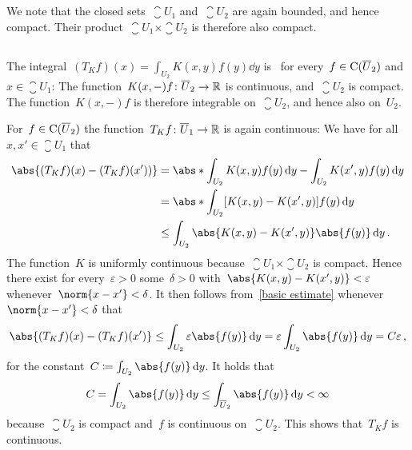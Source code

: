 \section{}

We note that the closed sets~$\closure{U}_1$ and~$\closure{U}_2$ are again bounded, and hence compact.
Their product~$\closure{U}_1 \times \closure{U}_2$ is therefore also compact.





\subsection{}

The integral~$(T_K f)(x) = \int_{U_2} K(x,y) f(y) \dd{y}$ is~{\welldef} for every~$f \in \operatorname{C}(\overline{U}_2)$ and~$x \in \closure{U}_1$:
The function~$K(x,-)f \colon \overline{U}_2 \to \mathbb{R}$ is continuous, and~$\closure{U}_2$ is compact.
The function~$K(x,-)f$ is therefore integrable on~$\closure{U}_2$, and hence also on~$U_2$.

For~$f \in \operatorname{C}(\overline{U}_2)$ the function~$T_K f \colon \overline{U}_1 \to \mathbb{R}$ is again continuous:
We have for all~$x, x' \in \closure{U}_1$ that
\begin{equation}
  \label{basic estimate}
  \begin{aligned}
          \abs{ (T_K f)(x) - (T_K f)(x') ) }
    &=    \abs*{ \int_{U_2} K(x,y) f(y) \dd{y} - \int_{U_2} K(x',y) f(y) \dd{y} } \\
    &=    \abs*{ \int_{U_2} [K(x,y) - K(x',y)] f(y) \dd{y} }  \\
    &\leq \int_{U_2} \abs{K(x,y) - K(x',y)} \abs{f(y)} \dd{y} \,.
  \end{aligned}
\end{equation}
The function~$K$ is uniformly continuous because~$\closure{U}_1 \times \closure{U}_2$ is compact.
Hence there exist for every~$\varepsilon > 0$ some~$\delta > 0$ with~$\abs{K(x,y) - K(x',y)} < \varepsilon$ whenever~$\norm{x - x'} < \delta$.
It then follows from~\eqref{basic estimate} whenever~$\norm{x - x'} < \delta$ that
\[
        \abs{ (T_K f)(x) - (T_K f)(x') }
  \leq  \int_{U_2} \varepsilon \abs{f(y)} \dd{y}
  =     \varepsilon \int_{U_2} \abs{f(y)} \dd{y}
  =     C \varepsilon \,,
\]
for the constant~$C \defined \int_{U_2} \abs{f(y)} \dd{y}$.
It holds that
\[
        C
  =     \int_{U_2} \abs{f(y)} \dd{y}
  \leq  \int_{\closure{U}_2} \abs{f(y)} \dd{y}
  <     \infty
\]
because~$\closure{U}_2$ is compact and~$f$ is continuous on~$\closure{U}_2$.
This shows that~$T_K f$ is continuous.

